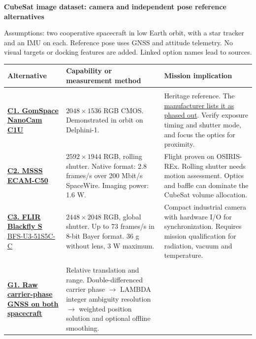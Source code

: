 \documentclass[10pt,a4paper,landscape]{article}
\begin{document}
{\large\bfseries CubeSat image dataset: camera and independent pose reference alternatives}\par
\smallskip
{\small Assumptions: two cooperative spacecraft in low Earth orbit, with a star tracker and an IMU on each. Reference pose uses GNSS and attitude telemetry. No visual targets or docking features are added. Linked option names lead to sources.}

\begin{table}[!ht]
\centering
\small
\renewcommand{\arraystretch}{1.08}
\begin{tabularx}{\linewidth}{@{}>{\RaggedRight\arraybackslash}p{44mm}YY@{}}
\toprule
\textbf{Alternative} & \textbf{Capability or measurement method} & \textbf{Mission implication} \\
\midrule
{} \\
\addlinespace[2pt]
\href{https://projects.au.dk/ausat/delphini1/images}{\textbf{C1. GomSpace NanoCam C1U}}
& $2048\times1536$ RGB CMOS. Demonstrated in orbit on Delphini-1.
& Heritage reference. The \href{https://gomspace.com/product/nanocam-c1u/}{manufacturer lists it as phased out}. Verify exposure timing and shutter mode, and focus the optics for proximity. \\
\addlinespace[3pt]
\href{https://www.msss.com/files/ECAM-C50_M50.pdf}{\textbf{C2. MSSS ECAM-C50}}
& $2592\times1944$ RGB, rolling shutter. Native format: 2.8 frames/s over 200 Mbit/s SpaceWire. Imaging power: 1.6 W.
& Flight proven on OSIRIS-REx. Rolling shutter needs motion assessment. Optics and baffle can dominate the CubeSat volume allocation. \\
\addlinespace[3pt]
\href{https://softwareservices.flir.com/BFS-U3-51S5/latest/Model/spec.html}{\textbf{C3. FLIR Blackfly S}\newline BFS-U3-51S5C-C}
& $2448\times2048$ RGB, global shutter. Up to 73 frames/s in 8-bit Bayer format. 36 g without lens, 3 W maximum.
& Compact industrial camera with hardware I/O for synchronization. Requires mission qualification for radiation, vacuum and temperature. \\
\midrule
{} \\
\addlinespace[2pt]
\href{https://navi.ion.org/content/71/3/navi.661}{\textbf{G1. Raw carrier-phase GNSS on both spacecraft}}
& Relative translation and range. Double-differenced carrier phase $\rightarrow$ LAMBDA integer ambiguity resolution $\rightarrow$ weighted position solution and optional offline smoothing.

\end{tabularx}
\end{table}
\end{document}
